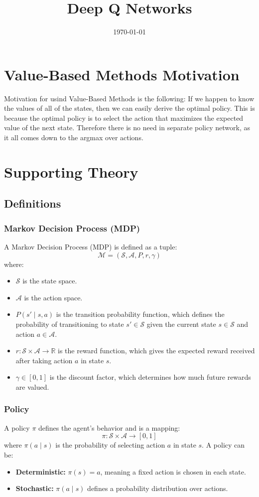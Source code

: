 \documentclass[a4paper,12pt]{article}
\title{\textbf{Deep Q Networks}}
\author{}
\date{\today}
\begin{document}
\maketitle

\section{Value-Based Methods Motivation}
Motivation for usind Value-Based Methods is the following: If we happen to know the values of all of the states, then we can easily derive the optimal policy. This is because the optimal policy is to select the action that maximizes the expected value of the next state. Therefore there is no need in separate policy network, as it all comes down to the argmax over actions.
\section{Supporting Theory}
\subsection{Definitions}
\subsubsection{Markov Decision Process (MDP)}
A Markov Decision Process (MDP) is defined as a tuple:
\[
\mathcal{M} = (\mathcal{S}, \mathcal{A}, P, r, \gamma)
\]
where:
\begin{itemize}
    \item $\mathcal{S}$ is the state space.
    \item $\mathcal{A}$ is the action space.
    \item $P(s' \mid s, a)$ is the transition probability function, which defines the probability of transitioning to state $s' \in \mathcal{S}$ given the current state $s \in \mathcal{S}$ and action $a \in \mathcal{A}$.
    \item $r: \mathcal{S} \times \mathcal{A} \to \mathbb{R}$ is the reward function, which gives the expected reward received after taking action $a$ in state $s$.
    \item $\gamma \in [0,1]$ is the discount factor, which determines how much future rewards are valued.
\end{itemize}

\subsubsection{Policy}
A policy $\pi$ defines the agent's behavior and is a mapping:
\[
\pi: \mathcal{S} \times \mathcal{A} \to [0,1]
\]
where $\pi(a \mid s)$ is the probability of selecting action $a$ in state $s$. A policy can be:
\begin{itemize}
    \item \textbf{Deterministic:} $\pi(s) = a$, meaning a fixed action is chosen in each state.
    \item \textbf{Stochastic:} $\pi(a \mid s)$ defines a probability distribution over actions.
\end{itemize}
\end{document}
